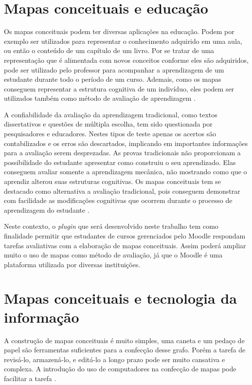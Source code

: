 \documentclass[
	12pt,				%
	openright,			%
	oneside,			%
	a4paper,			%
	english,			%
	french,				%
	spanish,			%
	brazil				%
	]{abntex2}
\begin{document}
\section{Mapas conceituais e educação}\label{sec-mapeduc}

Os mapas conceituais podem ter diversas aplicações na educação. Podem por exemplo ser utilizados para representar o conhecimento adquirido em uma aula, ou então o conteúdo de um capítulo de um livro. Por se tratar de uma representação que é alimentada com novos conceitos conforme eles são adquiridos, pode ser utilizado pelo professor para acompanhar a aprendizagem de um estudante durante todo o período de um curso. Ademais, como os mapas conseguem representar a estrutura cognitiva de um indivíduo, eles podem ser utilizados também como método de avaliação de aprendizagem \cite{Perin2014}.

A confiabilidade da avaliação da aprendizagem tradicional, como textos dissertativos e questões de múltipla escolha, tem sido questionada por pesquisadores e educadores. Nestes tipos de teste apenas os acertos são contabilizados e os erros são descartados, implicando em importantes informações para a avaliação serem desprezadas.
As provas tradicionais não proporcionam a possibilidade do estudante apresentar como construiu o seu aprendizado. Elas conseguem avaliar somente a aprendizagem mecânica, não mostrando como que o aprendiz alterou suas estruturas cognitivas.
Os mapas conceituais tem se destacado como alternativa a avaliação tradicional, pois conseguem demonstrar com facilidade as modificações cognitivas que ocorrem durante o processo de aprendizagem do estudante \cite{Dutra2002}.

Neste contexto, o \textit{plugin} que será desenvolvido neste trabalho tem como finalidade permitir que estudantes de cursos gerenciados pelo Moodle respondam tarefas avaliativas com a elaboração de mapas conceituais. Assim poderá ampliar muito o uso de mapas como método de avaliação, já que o Moodle é uma plataforma utilizada por diversas instituições.

\section{Mapas conceituais e tecnologia da informação}

A construção de mapas conceituais é muito simples, uma caneta e um pedaço de papel são ferramentas suficientes para a confecção desse grafo. Porém a tarefa de revisá-lo, armazená-lo, e editá-lo a longo prazo  pode ser muito cansativa e complexa. A introdução do uso de computadores na confecção de mapas pode facilitar a tarefa \cite{Novak2006}.
\end{document}
